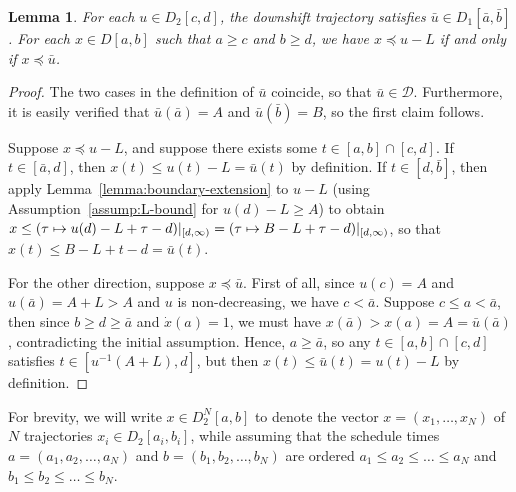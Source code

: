 \documentclass[a4paper]{article}
\theoremstyle{definition}
\theoremstyle{plain}
\newtheorem{lemma}{Lemma\hspace{0.25em}\ignorespaces}
\begin{document}
\begin{lemma}\label{lemma:downshift}
  For each $u \in D_{2}[c,d]$, the downshift trajectory satisfies
  $\bar{u} \in D_{1}[\bar{a},\bar{b}]$.
  For each $x \in D[a, b]$ such that $a \geq c$ and $b \geq d$, we have
  $x \preceq u - L$ if and only if $x \preceq \bar{u}$.
\end{lemma}
\begin{proof}
  The two cases in the definition of $\bar{u}$ coincide, so that
  $\bar{u} \in \mathcal{D}$. Furthermore, it is easily verified that
  $\bar{u}(\bar{a}) = A$ and $\bar{u}(\bar{b}) = B$, so the first claim
  follows.

  Suppose $x \preceq u - L$, and suppose there exists some
  $t \in [a,b] \cap [c,d]$. If $t \in [\bar{a}, d]$, then
  $x(t) \leq u(t) - L = \bar{u}(t)$ by definition. If $t \in [d, \bar{b}]$, then
  apply Lemma~\ref{lemma:boundary-extension} to $u - L$ (using
  Assumption~\ref{assump:L-bound} for $u(d) - L \geq A$) to obtain
  $x \leq (\tau \mapsto u(d) - L + \tau - d)|_{[d,\infty)} = (\tau \mapsto B - L + \tau - d)|_{[d,\infty)}$,
  so that $x(t) \leq B - L + t - d = \bar{u}(t)$.

  For the other direction, suppose $x \preceq \bar{u}$. First of all, since
  $u(c) = A$ and $u(\bar{a}) = A+L > A$ and $u$ is non-decreasing, we have
  $c < \bar{a}$.
  Suppose $c \leq a < \bar{a}$, then since $b \geq d \geq \bar{a}$ and
  $\dot{x}(a) = 1$, we must have
  $x(\bar{a}) > x(a) = A = \bar{u}(\bar{a})$, contradicting the initial
  assumption.
  Hence, $a \geq \bar{a}$, so any $t \in [a,b] \cap [c,d]$ satisfies
  $t \in [u^{-1}(A+L), d]$, but then $x(t) \leq \bar{u}(t) = u(t) - L$ by
  definition.
\end{proof}


For brevity, we will write $x \in D_{2}^{N}[a, b]$ to denote the vector $x = (x_{1}, \dots, x_{N})$
of $N$ trajectories $x_{i} \in D_{2}[a_{i},b_{i}]$, while assuming that the
schedule times $a = (a_{1}, a_{2}, \dots, a_{N})$ and
$b = (b_{1}, b_{2}, \dots, b_{N})$ are ordered
$a_{1} \leq a_{2} \leq \dots \leq a_{N}$ and
$b_{1} \leq b_{2} \leq \dots \leq b_{N}$.
\end{document}

